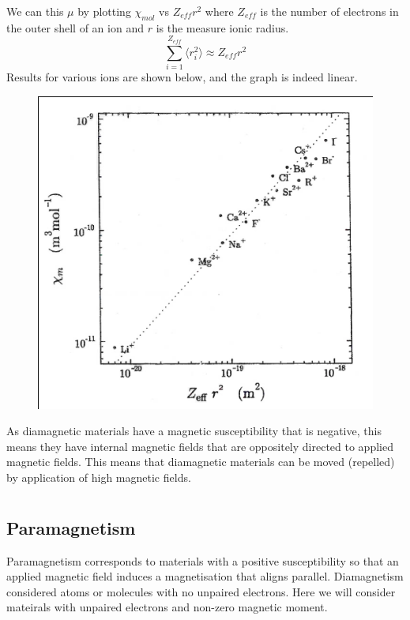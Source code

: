 \documentclass[a4paper, 11pt, normalem]{report}
\begin{document}
We can this $\mu$ by plotting $\chi_{mol}$ vs $Z_{eff}r^2$ where $Z_{eff}$ is the number of electrons in the outer shell of an ion and $r$ is the measure ionic radius.
\begin{equation}
    \sum_{i=1}^{Z_{eff}} \langle r_i^2\rangle \approx Z_{eff}r^2
\end{equation}
Results for various ions are shown below, and the graph is indeed linear. 
\begin{figure}[H]
    \centering
    \includegraphics[scale=0.5]{ions.png}
\end{figure}
As diamagnetic materials have a magnetic susceptibility that is negative, this means they have internal magnetic fields that are oppositely directed to applied magnetic fields. 
This means that diamagnetic materials can be moved (repelled) by application of high magnetic fields. 

\chapter{}
\section{Paramagnetism}
Paramagnetism corresponds to materials with a positive susceptibility so that an applied magnetic field induces a magnetisation that aligns parallel. 
Diamagnetism considered atoms or molecules with no unpaired electrons. 
Here we will consider mateirals with unpaired electrons and non-zero magnetic moment. 
\end{document}
